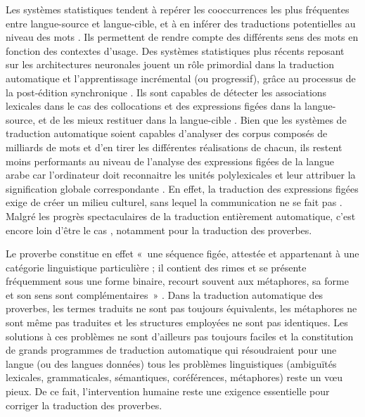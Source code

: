 \documentclass[french]{textolivre}
\begin{document}
Les systèmes statistiques tendent à repérer les cooccurrences les plus fréquentes entre langue-source et langue-cible, et à en inférer des traductions potentielles au niveau des mots \cite[p.~81]{poibeau_traduire_2016}. Ils permettent de rendre compte des différents sens des mots en fonction des contextes d’usage. Des systèmes statistiques plus récents reposant sur les architectures neuronales jouent un rôle primordial dans la traduction automatique et l’apprentissage incrémental (ou progressif), grâce au processus de la post-édition synchronique \cite[p.~228]{federico_challenges_2018}. Ils sont capables de détecter les associations lexicales dans le cas des collocations et des expressions figées dans la langue-source, et de les mieux restituer dans la langue-cible \cite{bentivogli_neural_2016, burlot_evaluation_2018, isabelle_challenge_2017}. Bien que les systèmes de traduction automatique soient capables d’analyser des corpus composés de milliards de mots et d’en tirer les différentes réalisations de chacun, ils restent moins performants au niveau de l’analyse des expressions figées de la langue arabe car l’ordinateur doit reconnaitre les unités polylexicales et leur attribuer la signification globale correspondante \cite[p.~248]{mejri_figement_2008}. En effet, la traduction des expressions figées exige de créer un milieu culturel, sans lequel la communication ne se fait pas \cite[p.~1]{vaguer_expressions_2011}. Malgré les progrès spectaculaires de la traduction entièrement automatique, c’est encore loin d’être le cas \cite{yvon_les_2019}, notamment pour la traduction des proverbes. 

Le proverbe constitue en effet « une séquence figée, attestée et appartenant à une catégorie linguistique particulière ; il contient des rimes et se présente fréquemment sous une forme binaire, recourt souvent aux métaphores, sa forme et son sens sont complémentaires » \cite[p.~36]{wozniak_peut-traduire_2010}. Dans la traduction automatique des proverbes, les termes traduits ne sont pas toujours équivalents, les métaphores ne sont même pas traduites et les structures employées ne sont pas identiques. Les solutions à ces problèmes ne sont d’ailleurs pas toujours faciles \cite[p.~33]{madec_traduction_nodate} et la constitution de grands programmes de traduction automatique qui résoudraient pour une langue (ou des langues données) tous les problèmes linguistiques (ambiguïtés lexicales, grammaticales, sémantiques, coréférences, métaphores) reste un vœu pieux. De ce fait, l’intervention humaine reste une exigence essentielle pour corriger la traduction des proverbes. 
\end{document}
